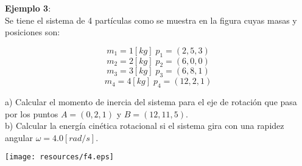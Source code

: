 \documentclass[letter,twoside,11pt]{article}
\begin{document}
\begin{minipage}[c]{.4\linewidth}
\textbf{Ejemplo 3}:\\
Se tiene el sistema de 4 partículas como se muestra en la figura cuyas masas y
posiciones son:

\begin{equation*}
    m_1 = 1 [kg]\; p_1 = (2,5,3)
\end{equation*}
\begin{equation*}
    m_2 = 2 [kg]\; p_2 = (6,0,0)
\end{equation*}
\begin{equation*}
    m_3 = 3 [kg]\; p_3 = (6,8,1)
\end{equation*}
\begin{equation*}
    m_4 = 4 [kg]\; p_4 = (12,2,1)
\end{equation*}

a) Calcular el momento de inercia del sistema para el eje de rotación que pasa
por los puntos $A = (0,2,1)$ y $B = (12,11,5)$. \\
b) Calcular la energía cinética rotacional si el sistema gira con una rapidez
angular $\omega = 4.0 [rad/s]$.
\end{minipage}\hfill
\begin{minipage}{.5\linewidth}
\texttt{[image: resources/f4.eps]}
\end{minipage}
\\
\\
\end{document}
